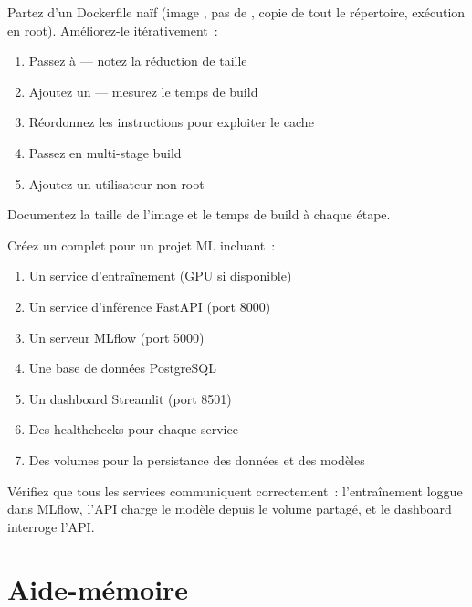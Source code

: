 \begin{exercice}
Partez d'un Dockerfile na\"if (image , pas de
, copie de tout le r\'epertoire, ex\'ecution en root).
Am\'eliorez-le it\'erativement~:
\begin{enumerate}
  \item Passez \`a  --- notez la r\'eduction de taille
  \item Ajoutez un  --- mesurez le temps de build
  \item R\'eordonnez les instructions pour exploiter le cache
  \item Passez en multi-stage build
  \item Ajoutez un utilisateur non-root
\end{enumerate}
Documentez la taille de l'image et le temps de build \`a chaque \'etape.
\end{exercice}

\begin{exercice}
Cr\'eez un  complet pour un projet ML incluant~:
\begin{enumerate}
  \item Un service d'entra\^inement (GPU si disponible)
  \item Un service d'inf\'erence FastAPI (port 8000)
  \item Un serveur MLflow (port 5000)
  \item Une base de donn\'ees PostgreSQL
  \item Un dashboard Streamlit (port 8501)
  \item Des healthchecks pour chaque service
  \item Des volumes pour la persistance des donn\'ees et des mod\`eles
\end{enumerate}
V\'erifiez que tous les services communiquent correctement~: l'entra\^inement
loggue dans MLflow, l'API charge le mod\`ele depuis le volume partag\'e, et
le dashboard interroge l'API.
\end{exercice}

\section{Aide-m\'emoire}

